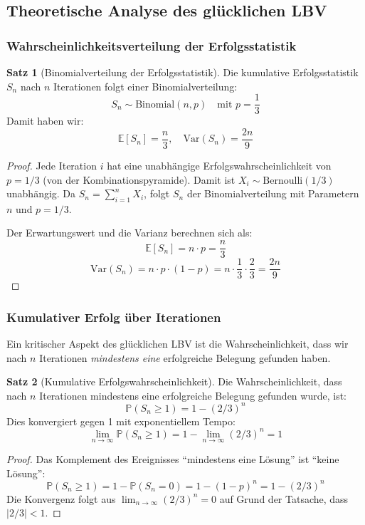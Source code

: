 ﻿\documentclass[a4paper,12pt]{article}
\theoremstyle{definition}
\newtheorem{satz}{Satz}
\begin{document}
\subsection{Theoretische Analyse des glücklichen LBV}

\subsubsection{Wahrscheinlichkeitsverteilung der Erfolgsstatistik}

\begin{satz}[Binomialverteilung der Erfolgsstatistik]
Die kumulative Erfolgsstatistik $S_n$ nach $n$ Iterationen folgt einer Binomialverteilung:
\[
S_n \sim \text{Binomial}(n, p) \quad \text{mit } p = \frac{1}{3}
\]
Damit haben wir:
\[
\mathbb{E}[S_n] = \frac{n}{3}, \quad \text{Var}(S_n) = \frac{2n}{9}
\]
\end{satz}

\begin{proof}
Jede Iteration $i$ hat eine unabhängige Erfolgswahrscheinlichkeit von $p = 1/3$ (von der Kombinationspyramide). Damit ist $X_i \sim \text{Bernoulli}(1/3)$ unabhängig. Da $S_n = \sum_{i=1}^{n} X_i$, folgt $S_n$ der Binomialverteilung mit Parametern $n$ und $p = 1/3$.

Der Erwartungswert und die Varianz berechnen sich als:
\[
\mathbb{E}[S_n] = n \cdot p = \frac{n}{3}
\]
\[
\text{Var}(S_n) = n \cdot p \cdot (1-p) = n \cdot \frac{1}{3} \cdot \frac{2}{3} = \frac{2n}{9}
\]
\end{proof}

\subsubsection{Kumulativer Erfolg über Iterationen}

Ein kritischer Aspekt des glücklichen LBV ist die Wahrscheinlichkeit, dass wir nach $n$ Iterationen \emph{mindestens eine} erfolgreiche Belegung gefunden haben.

\begin{satz}[Kumulative Erfolgswahrscheinlichkeit]
Die Wahrscheinlichkeit, dass nach $n$ Iterationen mindestens eine erfolgreiche Belegung gefunden wurde, ist:
\[
\mathbb{P}(S_n \geq 1) = 1 - (2/3)^n
\]
Dies konvergiert gegen 1 mit exponentiellem Tempo:
\[
\lim_{n \to \infty} \mathbb{P}(S_n \geq 1) = 1 - \lim_{n \to \infty} (2/3)^n = 1
\]
\end{satz}

\begin{proof}
Das Komplement des Ereignisses ``mindestens eine Lösung'' ist ``keine Lösung'':
\[
\mathbb{P}(S_n \geq 1) = 1 - \mathbb{P}(S_n = 0) = 1 - (1 - p)^n = 1 - (2/3)^n
\]
Die Konvergenz folgt aus $\lim_{n \to \infty} (2/3)^n = 0$ auf Grund der Tatsache, dass $|2/3| < 1$.
\end{proof}
\end{document}
